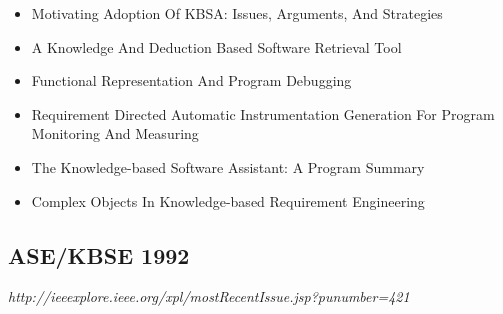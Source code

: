 {\begin{itemize}[itemsep=-1ex]
  \item Motivating Adoption Of KBSA: Issues, Arguments, And Strategies
  \item A Knowledge And Deduction Based Software Retrieval Tool
  \item Functional Representation And Program Debugging
  \item Requirement Directed Automatic Instrumentation Generation For Program Monitoring And Measuring
  \item The Knowledge-based Software Assistant: A Program Summary
  \item Complex Objects In Knowledge-based Requirement Engineering
\end{itemize}
}

\subsection{ASE/KBSE 1992}

{\small \em http://ieeexplore.ieee.org/xpl/mostRecentIssue.jsp?punumber=421}

